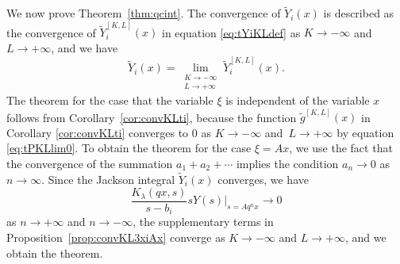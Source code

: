 \documentclass[pdftex]{sigma}
\numberwithin{equation}{section}
\theoremstyle{definition}
\begin{document}
We now prove Theorem~\ref{thm:qcint}.
The convergence of $\widetilde{Y}_{i} (x) $ is described as the convergence of $\widetilde{Y}_{i}^{[K,L]}(x) $ in equation \eqref{eq:tYiKLdef} as $ K \to -\infty $ and $L \to +\infty $, and we have
\[
 \widetilde{Y}_{i}(x) = \lim _{\substack{K \to -\infty \\ L \to +\infty}} \widetilde{Y}_{i}^{[K,L]}(x).
 \]
The theorem for the case that the variable $\xi $ is independent of the variable $x$ follows from Corollary~\ref{cor:convKLti}, because the function $ \widetilde{g}^{[K,L]} (x)$ in Corollary \ref{cor:convKLti} converges to $0$ as $ K \to -\infty $ and~${L \to +\infty }$ by equation \eqref{eq:tPKLlim0}.
To obtain the theorem for the case $\xi =Ax$, we use the fact that the convergence of the summation $a_1 + a_2 + \cdots $ implies the condition $a_n \to 0 $ as $n \to \infty $.
Since the Jackson integral $\widetilde{Y}_{i} (x) $ converges, we have
\begin{equation*}
 \frac{K_{\lambda}(qx, s) }{s-b_i} s Y(s) |_{s=A q^n x } \to 0
\end{equation*}
as $n \to +\infty $ and $n \to -\infty $, the supplementary terms in Proposition~\ref{prop:convKL3xiAx} converge as $ K \to -\infty $ and $L \to +\infty $, and we obtain the theorem.
\end{document}
